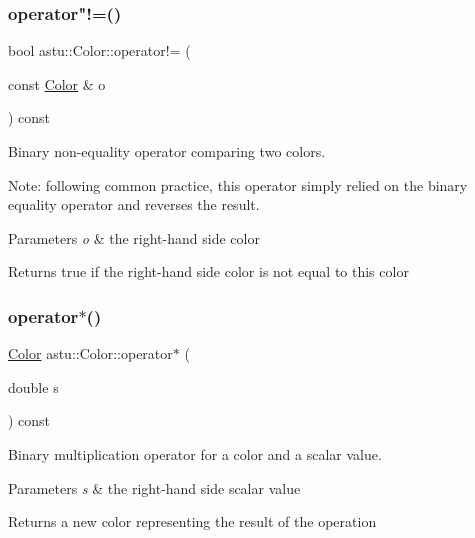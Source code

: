 \subsubsection{\texorpdfstring{operator"!=()}{operator!=()}}
{\footnotesize\ttfamily bool astu\+::\+Color\+::operator!= (\begin{DoxyParamCaption}\item[{const \hyperlink{classastu_1_1Color}{Color} \&}]{o }\end{DoxyParamCaption}) const\hspace{0.3cm}{\ttfamily [inline]}}

Binary non-\/equality operator comparing two colors.

Note\+: following common practice, this operator simply relied on the binary equality operator and reverses the result.


\begin{DoxyParams}{Parameters}
{\em o} & the right-\/hand side color \\
\hline
\end{DoxyParams}
\begin{DoxyReturn}{Returns}
{\ttfamily true} if the right-\/hand side color is not equal to this color 
\end{DoxyReturn}
\mbox{\label{classastu_1_1Color_a287594eff638030b35765bfe00e76606}} 
\subsubsection{\texorpdfstring{operator$\ast$()}{operator*()}}
{\footnotesize\ttfamily \hyperlink{classastu_1_1Color}{Color} astu\+::\+Color\+::operator$\ast$ (\begin{DoxyParamCaption}\item[{double}]{s }\end{DoxyParamCaption}) const}

Binary multiplication operator for a color and a scalar value.


\begin{DoxyParams}{Parameters}
{\em s} & the right-\/hand side scalar value \\
\hline
\end{DoxyParams}
\begin{DoxyReturn}{Returns}
a new color representing the result of the operation 
\end{DoxyReturn}
\mbox{\label{classastu_1_1Color_adf79aa3c1511b986cb7ac14d32524ad4}} 
